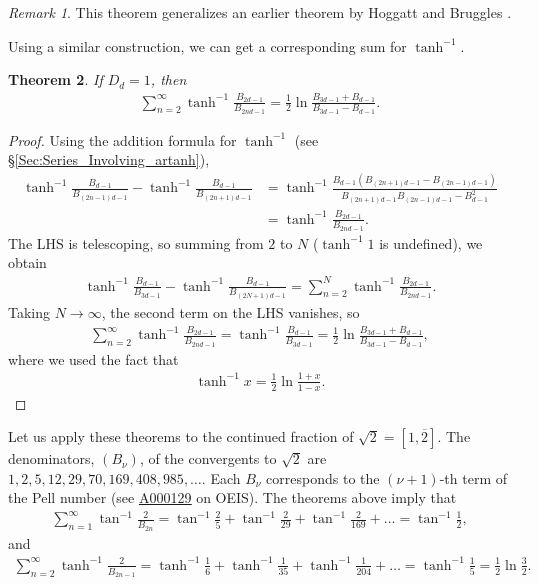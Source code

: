 \documentclass[12pt]{article}
\theoremstyle{plain}
\newtheorem{theorem}{Theorem}
\theoremstyle{definition}
\theoremstyle{remark}
\newtheorem{remark}[theorem]{Remark}
\newcommand{\seqnum}[1]{\href{https://oeis.org/#1}{\rm \underline{#1}}}
\begin{document}
\begin{remark} This theorem generalizes an earlier theorem by Hoggatt and Bruggles \cite[Theorem 4]{Hoggatt_Bruggles_64}.
\end{remark}

Using a similar construction, we can get a corresponding sum for $ \tanh^{-1} $.
\begin{theorem} \label{Th:Telescoping_artanh} If $ D_d = 1 $, then
\begin{align*}
	\sum_{n = 2}^\infty \tanh^{-1} \frac{B_{2d - 1}}{B_{2nd - 1}} = \frac{1}{2} \ln \frac{B_{3d - 1} + B_{d - 1}}{B_{3d - 1} - B_{d - 1}}.
\end{align*}
\end{theorem}

\begin{proof} Using the addition formula for $ \tanh^{-1} $ (see \S \ref{Sec:Series_Involving_artanh}),
\begin{align*}
	\tanh^{-1} \frac{B_{d - 1}}{B_{(2n - 1)d - 1}} - \tanh^{-1} \frac{B_{d - 1}}{B_{(2n + 1)d - 1}} &= \tanh^{-1} \frac{B_{d - 1} (B_{(2n + 1)d - 1} - B_{(2n - 1)d - 1})}{B_{(2n + 1)d - 1} B_{(2n - 1)d - 1} - B_{d - 1}^2} \\
	&= \tanh^{-1} \frac{B_{2d - 1}}{B_{2nd - 1}}.
\end{align*}
The LHS is telescoping, so summing from $ 2 $ to $ N $ ($ \tanh^{-1} 1 $ is undefined), we obtain
\begin{align*}
	\tanh^{-1} \frac{B_{d - 1}}{B_{3d - 1}} - \tanh^{-1} \frac{B_{d - 1}}{B_{(2N + 1)d - 1}} = \sum_{n = 2}^N \tanh^{-1} \frac{B_{2d - 1}}{B_{2nd - 1}}.
\end{align*}
Taking $ N \longrightarrow \infty $, the second term on the LHS vanishes, so
\begin{align*}
	\sum_{n = 2}^\infty \tanh^{-1} \frac{B_{2d - 1}}{B_{2nd - 1}} = \tanh^{-1} \frac{B_{d - 1}}{B_{3d - 1}} = \frac{1}{2} \ln \frac{B_{3d - 1} + B_{d - 1}}{B_{3d - 1} - B_{d - 1}},
\end{align*}
where we used the fact that 
\begin{align*}
	\tanh^{-1} x = \frac{1}{2} \ln \frac{1 + x}{1 - x}.
\end{align*}
\end{proof}

Let us apply these theorems to the continued fraction of $ \sqrt{2} = [1, \overline{2}] $. The denominators, $ (B_\nu) $, of the convergents to $ \sqrt{2} $ are $ 1, 2, 5, 12, 29, 70, 169, 408, 985, \ldots $. Each $ B_\nu $ corresponds to the $ (\nu + 1) $-th term of the Pell number (see \seqnum{A000129} on OEIS). The theorems above imply that
\begin{align*}
	\sum_{n = 1}^\infty \tan^{-1} \frac{2}{B_{2n}} = \tan^{-1} \frac{2}{5} + \tan^{-1} \frac{2}{29} + \tan^{-1} \frac{2}{169} + \ldots = \tan^{-1} \frac{1}{2},
\end{align*}
and
\begin{align*}
	\sum_{n = 2}^\infty \tanh^{-1} \frac{2}{B_{2n - 1}} = \tanh^{-1} \frac{1}{6} + \tanh^{-1} \frac{1}{35} + \tanh^{-1} \frac{1}{204} + \ldots = \tanh^{-1} \frac{1}{5} = \frac{1}{2} \ln \frac{3}{2}.
\end{align*}
\end{document}
